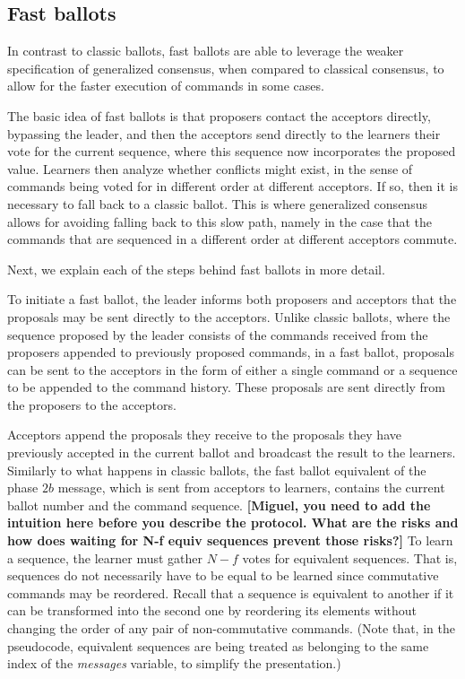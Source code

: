\subsection{Fast ballots} 

In contrast to classic ballots, fast ballots are able to leverage the weaker
specification of generalized consensus, when compared to classical consensus,
to allow for the faster execution of commands in some cases.

The basic idea of fast ballots is that proposers contact the acceptors
directly, bypassing the leader, and then the acceptors send directly
to the learners their vote for the current sequence, where this
sequence now incorporates the proposed value. Learners then analyze
whether conflicts might exist, in the sense of commands being voted
for in different order at different acceptors. If so, then it is
necessary to fall back to a classic ballot. This is where generalized
consensus allows for avoiding falling back to this slow path, namely
in the case that the commands that are sequenced in a different order
at different acceptors commute.

Next, we explain each of the steps behind fast ballots in more detail.

To initiate a fast ballot, the leader informs both proposers and acceptors that the proposals may be sent directly to the acceptors. Unlike classic ballots, where the sequence proposed by the leader consists of the commands received from the proposers appended to previously proposed commands, in a fast ballot, proposals can be sent to the acceptors in the form of either a single command or a sequence to be appended to the command history. These proposals are sent directly from the proposers to the acceptors.

Acceptors append the proposals they receive to the proposals they have previously accepted in the current ballot and broadcast the result to the learners. Similarly to what happens in classic ballots, the fast ballot equivalent of the phase $2b$ message, which is sent from acceptors to learners, contains the current ballot number and the command sequence. {\bf [Miguel, you need to add the intuition here before you describe the protocol. What are the risks and how does waiting for N-f equiv sequences prevent those risks?]} To learn a sequence, the learner must gather $N-f$ votes for equivalent sequences. That is, sequences do not necessarily have to be equal to be learned since commutative commands may be reordered. Recall that a sequence is equivalent to another if it can be transformed into the second one by reordering its elements without changing the order of any pair of non-commutative commands. (Note that, in the pseudocode, equivalent sequences are being treated as belonging to the same index of the \emph{messages} variable, to simplify the presentation.) \par

